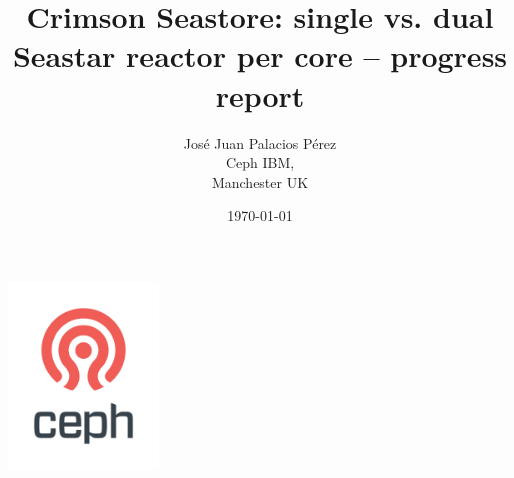 \title{\textbf{Crimson Seastore: single vs. dual Seastar reactor per core} -- progress report}
\author{Jos\'e Juan Palacios P\'erez\\Ceph IBM,\\Manchester UK}
\date{\today}

\graphicspath{ {../figures/} }
\begin{titlepage}
 \begin{minipage}{\textwidth}
   \begin{center}
      \includegraphics[width=0.3\textwidth]{ceph_362px.png}
      \maketitle
   \end{center}
   
   \vspace{0.5cm}
   \vfill
  \end{minipage}
\end{titlepage}
\tableofcontents
